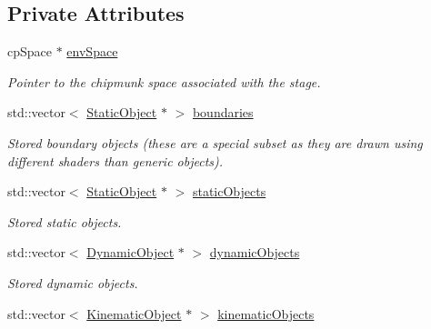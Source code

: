 \subsection*{Private Attributes}
\begin{DoxyCompactItemize}
\item 
cp\+Space $\ast$ \hyperlink{class_stage_a76084dcddff87933d320310c0dd3e0c9}{env\+Space}\hypertarget{class_stage_a76084dcddff87933d320310c0dd3e0c9}{}\label{class_stage_a76084dcddff87933d320310c0dd3e0c9}

\begin{DoxyCompactList}\small\item\em Pointer to the chipmunk space associated with the stage. \end{DoxyCompactList}\item 
std\+::vector$<$ \hyperlink{class_static_object}{Static\+Object} $\ast$ $>$ \hyperlink{class_stage_ab34d8deef8f88d3398250563aa50cc69}{boundaries}\hypertarget{class_stage_ab34d8deef8f88d3398250563aa50cc69}{}\label{class_stage_ab34d8deef8f88d3398250563aa50cc69}

\begin{DoxyCompactList}\small\item\em Stored boundary objects (these are a special subset as they are drawn using different shaders than generic objects). \end{DoxyCompactList}\item 
std\+::vector$<$ \hyperlink{class_static_object}{Static\+Object} $\ast$ $>$ \hyperlink{class_stage_aae6a59e219be97f815ab76bac3cb24f2}{static\+Objects}\hypertarget{class_stage_aae6a59e219be97f815ab76bac3cb24f2}{}\label{class_stage_aae6a59e219be97f815ab76bac3cb24f2}

\begin{DoxyCompactList}\small\item\em Stored static objects. \end{DoxyCompactList}\item 
std\+::vector$<$ \hyperlink{class_dynamic_object}{Dynamic\+Object} $\ast$ $>$ \hyperlink{class_stage_a2d811b8113298f3ba1189b8351124aa5}{dynamic\+Objects}\hypertarget{class_stage_a2d811b8113298f3ba1189b8351124aa5}{}\label{class_stage_a2d811b8113298f3ba1189b8351124aa5}

\begin{DoxyCompactList}\small\item\em Stored dynamic objects. \end{DoxyCompactList}\item 
std\+::vector$<$ \hyperlink{class_kinematic_object}{Kinematic\+Object} $\ast$ $>$ \hyperlink{class_stage_ae19e1e3837dbfce1b5b56baea357257c}{kinematic\+Objects}\hypertarget{class_stage_ae19e1e3837dbfce1b5b56baea357257c}{}\label{class_stage_ae19e1e3837dbfce1b5b56baea357257c}


\end{DoxyCompactItemize}
